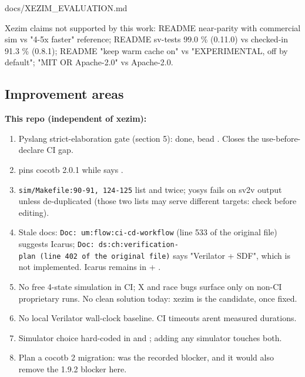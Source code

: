 \begin{relocated}{docs/XEZIM_EVALUATION.md}
{}

Xezim claims not supported by this work: README near-parity with
commercial sim vs  "4-5x faster" reference; README
sv-tests 99.0 \% (0.11.0) vs checked-in 91.3 \% (0.8.1); README "keep
warm cache on" vs  "EXPERIMENTAL, off by default";
 "MIT OR Apache-2.0" vs  Apache-2.0.

\subsection{Improvement areas}\label{tm:dec:xezim:8-improvement-areas}

\textbf{This repo (independent of xezim):}

\begin{enumerate}
\def\labelenumi{\arabic{enumi}.}
\tightlist
\item
  Pyslang strict-elaboration gate (section 5): done, bead .
  Closes the use-before-declare CI gap.
\item
   pins cocotb 2.0.1 while  says
  .
\item
  \texttt{sim/\allowbreak{}Makefile:\allowbreak{}90-\allowbreak{}91,\allowbreak{}\ 124-\allowbreak{}125}
  list  and  twice; yosys fails
  on sv2v output unless de-duplicated (those two lists may serve
  different targets: check before editing).
\item
  Stale docs:
  \texttt{Doc:\allowbreak{}\ um:\allowbreak{}flow:\allowbreak{}ci-\allowbreak{}cd-\allowbreak{}workflow}
  (line 533 of the original file) suggests Icarus;
  \texttt{Doc:\allowbreak{}\ ds:\allowbreak{}ch:\allowbreak{}verification-\allowbreak{}plan\ (line\ 402\ of\ the\ original\ file)}
  says "Verilator + SDF", which is not implemented. Icarus remains in
   + .
\item
  No free 4-state simulation in CI; X and race bugs surface only on
  non-CI proprietary runs. No clean solution today: xezim is the
  candidate, once fixed.
\item
  No local Verilator wall-clock baseline. CI timeouts
  aren\textquotesingle t measured durations.
\item
  Simulator choice hard-coded in  and
  ; adding any simulator touches both.
\item
  Plan a cocotb 2 migration:  was the recorded blocker, and
  it would also remove the 1.9.2 blocker here.
\end{enumerate}


\end{relocated}
